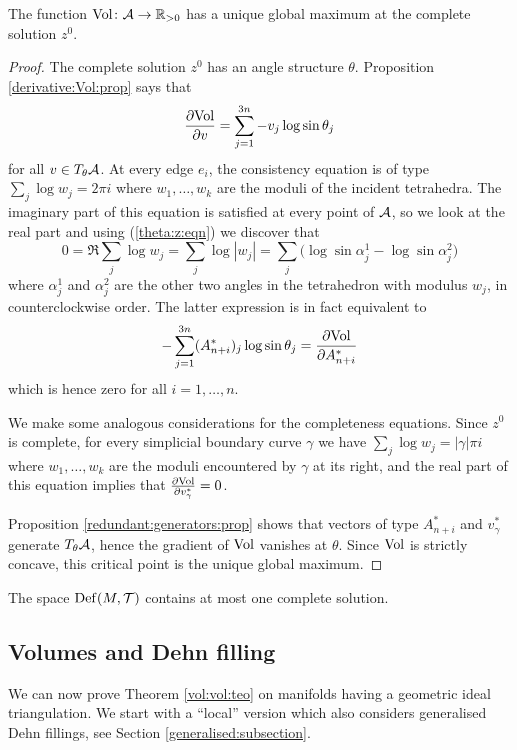 \begin{prop} \label{Vol:maximum:prop}
The function ${\rm Vol}\colon \mathcal{A} \to \mathbb{R}_{>0}$ has a unique global maximum at the complete solution $z^0$.
\end{prop}
\begin{proof}
The complete solution $z^0$ has an angle structure $\theta$. Proposition \ref{derivative:Vol:prop} says that
$$\frac{\partial {\rm Vol}}{\partial v} = \sum_{j=1}^{3n} -v_j \log \sin \theta_j$$
for all $v\in T_{\theta}\mathcal{A}$. At every edge $e_i$, the consistency equation is of type $\sum_j \log w_j = 2\pi i$ where $w_1,\ldots, w_k$ are the moduli of the incident tetrahedra. The imaginary part of this equation is satisfied at every point of $\mathcal{A}$, so we look at the real part and using (\ref{theta:z:eqn}) we discover that 
$$0 = \Re \sum_j \log w_j = \sum_j \log |w_j| = \sum_j \big(\log \sin \alpha_{j}^1 - \log \sin \alpha_j^2\big) $$
where $\alpha_j^1$ and $\alpha_j^2$ are the other two angles in the tetrahedron with modulus $w_j$, in counterclockwise order. The latter expression is in fact equivalent to 
$$-\sum_{j=1}^{3n} (A_{n+i}^*)_j\log\sin \theta_j = \frac{\partial {\rm Vol}}{\partial A_{n+i}^*}$$
which is hence zero for all $i=1,\ldots, n$.

We make some analogous considerations for the completeness equations. Since $z^0$ is complete, for every simplicial boundary curve $\gamma$ we have $\sum_j \log w_j = |\gamma|\pi i$ where $w_1,\ldots, w_k$ are the moduli encountered by $\gamma$ at its right, and the real part of this equation implies that $\frac{\partial {\rm Vol}}{\partial v_\gamma^*} = 0$.

Proposition \ref{redundant:generators:prop} shows that vectors of type $A_{n+i}^*$ and $v_\gamma^*$ generate $T_{\theta}\mathcal{A}$, hence the gradient of ${\rm Vol}$ vanishes at $\theta$. Since ${\rm Vol}$ is strictly concave, this critical point is the unique global maximum.
\end{proof}

\begin{cor}
The space ${\rm Def}(M,\mathcal{T})$ contains at most one complete solution.
\end{cor}

\subsection{Volumes and Dehn filling}
We can now prove Theorem \ref{vol:vol:teo} on manifolds having a geometric ideal triangulation. We start with a ``local'' version which also considers generalised Dehn fillings, see Section \ref{generalised:subsection}.

